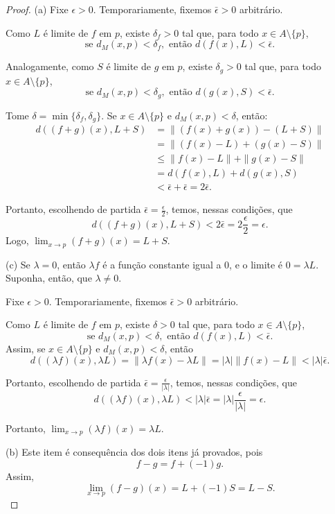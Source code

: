 \begin{proof}
    (a) Fixe $\epsilon>0$.
    Temporariamente, fixemos $\bar \epsilon>0$ arbitrário.

    Como $L$ é limite de $f$ em $p$, existe $\delta_f>0$ tal que, para todo $x\in A\setminus\{p\}$,
    \[
        \text{se }d_M(x,p)<\delta_f,\text{ então }d(f(x),L)<\bar \epsilon.
    \]

    Analogamente, como $S$ é limite de $g$ em $p$, existe $\delta_g>0$ tal que, para todo $x\in A\setminus\{p\}$,
    \[
        \text{se }d_M(x,p)<\delta_g,\text{ então }d(g(x),S)<\bar \epsilon.
    \]

    Tome $\delta=\min\{\delta_f,\delta_g\}$.
    Se $x\in A\setminus\{p\}$ e $d_M(x,p)<\delta$, então:
    \begin{align*}
        d((f+g)(x),L+S)
        &=\|(f(x)+g(x))-(L+S)\|\\
        &=\|(f(x)-L)+(g(x)-S)\|\\
        &\leq \|f(x)-L\|+\|g(x)-S\|\\
        &=d(f(x),L)+d(g(x),S)\\
        &<\bar \epsilon+\bar \epsilon
        =2\bar \epsilon.
    \end{align*}

    Portanto, escolhendo de partida $\bar \epsilon=\frac{\epsilon}{2}$, temos, nessas condições, que
    \[
            d((f+g)(x),L+S)<2\bar \epsilon=2\frac{\epsilon}{2}=\epsilon.
    \]
    Logo, $\lim_{x\to p}(f+g)(x)=L+S$.
    
    \medskip

    (c) Se $\lambda=0$, então $\lambda f$ é a função constante igual a $0$, e o limite é $0=\lambda L$.
    Suponha, então, que $\lambda\neq 0$.

    Fixe $\epsilon>0$.
    Temporariamente, fixemos $\bar \epsilon>0$ arbitrário.

    Como $L$ é limite de $f$ em $p$, existe $\delta>0$ tal que, para todo $x\in A\setminus\{p\}$,
    \[
        \text{se }d_M(x,p)<\delta,\text{ então }d(f(x),L)<\bar \epsilon.
    \]
    Assim, se $x\in A\setminus\{p\}$ e $d_M(x,p)<\delta$, então
    \[
        d((\lambda f)(x),\lambda L)
        =
        \|\lambda f(x)-\lambda L\|
        =
        |\lambda|\|f(x)-L\|
        <
        |\lambda|\bar \epsilon.
    \]

    Portanto, escolhendo de partida $\bar \epsilon=\frac{\epsilon}{|\lambda|}$, temos, nessas condições, que
    \[
        d((\lambda f)(x),\lambda L)<|\lambda|\bar \epsilon=|\lambda|\frac{\epsilon}{|\lambda|}=\epsilon.
    \]

    Portanto, $\lim_{x\to p}(\lambda f)(x)=\lambda L$.

    (b) Este item é consequência dos dois itens já provados, pois
    \[
        f-g=f+(-1)g.
    \]
    Assim,
    \[
        \lim_{x\to p}(f-g)(x)
        =
        L+(-1)S
        =
        L-S.
    \]
\end{proof}

